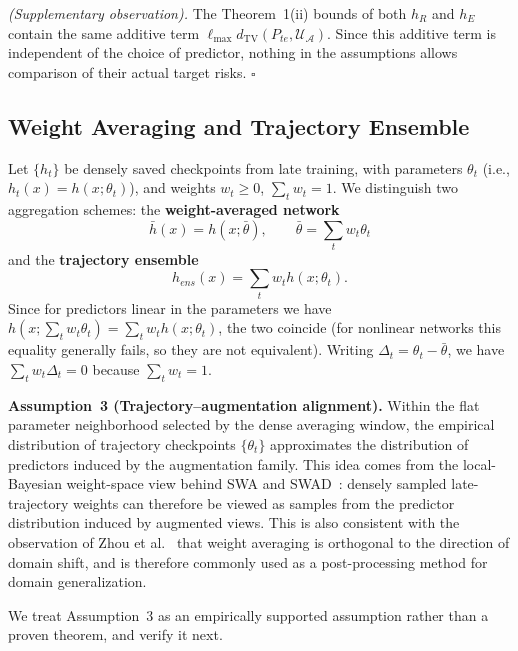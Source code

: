 \documentclass[electronics,article,submit,moreauthors]{Definitions/mdpi}
\newcommand{\add}[1]{\textcolor{addblue}{#1}}
\def\add#1{#1}%
\renewcommand{\add}[1]{#1}
\begin{document}
\emph{(Supplementary observation).} The Theorem~1(ii) bounds of both $h_R$ and $h_E$ contain the same additive term $\ell_{\max}d_{\mathrm{TV}}(P_{te},\mathcal{U}_{\mathcal{A}})$. Since this additive term is independent of the choice of predictor, nothing in the assumptions allows comparison of their actual target risks. \hfill$\square$

\subsection{Weight Averaging and Trajectory Ensemble}

Let $\{h_t\}$ be densely saved checkpoints from late training, with parameters $\theta_t$ (i.e., $h_t(x)=h(x;\theta_t)$), and weights $w_t\geq 0$, $\sum_t w_t=1$. We distinguish two aggregation schemes: the \textbf{weight-averaged network}
\begin{equation}
\bar h(x)=h(x;\bar\theta),\qquad \bar\theta=\sum_t w_t\theta_t
\end{equation}
and the \textbf{trajectory ensemble}
\begin{equation}
h_{ens}(x)=\sum_t w_t h(x;\theta_t).
\end{equation}
Since for predictors linear in the parameters we have $h(x;\sum_t w_t\theta_t)=\sum_t w_t h(x;\theta_t)$, the two coincide (for nonlinear networks this equality generally fails, so they are not equivalent). Writing $\Delta_t=\theta_t-\bar\theta$, we have $\sum_t w_t\Delta_t=0$ because $\sum_t w_t=1$.

\noindent\textbf{Assumption~3 (Trajectory--augmentation alignment).} Within the flat parameter neighborhood selected by the dense averaging window, the empirical distribution of trajectory checkpoints $\{\theta_t\}$ approximates the distribution of predictors induced by the augmentation family. This idea comes from the local-Bayesian weight-space view behind SWA and SWAD~\citep{ref42}: densely sampled late-trajectory weights can therefore be viewed as samples from the predictor distribution induced by augmented views. This is also consistent with the observation of Zhou et al.~\citep{ref4} that weight averaging is orthogonal to the direction of domain shift, and is therefore commonly used as a post-processing method for domain generalization.

\add{We treat Assumption~3 as an empirically supported assumption rather than a proven theorem, and verify it next.}
\end{document}
